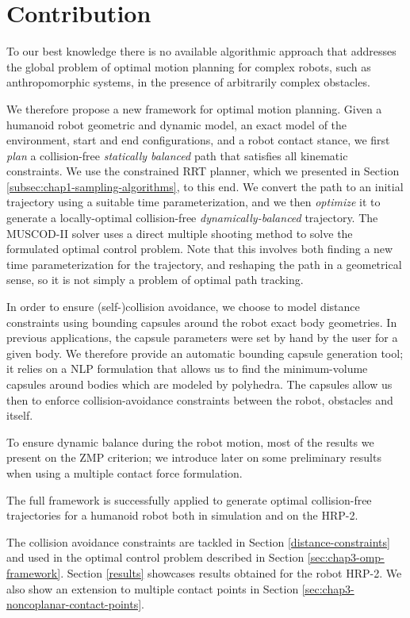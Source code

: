 \section{Contribution}
\label{sec:chap3-contribution}

To our best knowledge there is no available algorithmic approach that
addresses the global problem of optimal motion planning for complex
robots, such as anthropomorphic systems, in the presence of
arbitrarily complex obstacles.

We therefore propose a new framework for optimal motion
planning. Given a humanoid robot geometric and dynamic model, an exact
model of the environment, start and end configurations, and a robot
contact stance, we first \emph{plan} a collision-free \emph{statically
  balanced} path that satisfies all kinematic constraints. We use the
constrained RRT planner, which we presented in Section
\ref{subsec:chap1-sampling-algorithms}, to this end. We convert the
path to an initial trajectory using a suitable time parameterization,
and we then \emph{optimize} it to generate a locally-optimal
collision-free \emph{dynamically-balanced} trajectory. The
\textsc{MUSCOD-II} solver uses a direct multiple shooting method to
solve the formulated optimal control problem. Note that this involves
both finding a new time parameterization for the trajectory, and
reshaping the path in a geometrical sense, so it is not simply a
problem of optimal path tracking.

In order to ensure (self-)collision avoidance, we choose to model
distance constraints using bounding capsules around the robot exact
body geometries. In previous applications, the capsule parameters were
set by hand by the user for a given body. We therefore provide an
automatic bounding capsule generation tool; it relies on a NLP
formulation that allows us to find the minimum-volume capsules around
bodies which are modeled by polyhedra. The capsules allow us then to
enforce collision-avoidance constraints between the robot, obstacles
and itself.

To ensure dynamic balance during the robot motion, most of the results
we present on the ZMP criterion; we introduce later on some
preliminary results when using a multiple contact force formulation.

The full framework is successfully applied to generate optimal
collision-free trajectories for a humanoid robot both in simulation
and on the HRP-2.

The collision avoidance constraints are tackled in Section
\ref{distance-constraints} and used in the optimal control problem
described in Section \ref{sec:chap3-omp-framework}. Section
\ref{results} showcases results obtained for the robot HRP-2. We also
show an extension to multiple contact points in Section
\ref{sec:chap3-noncoplanar-contact-points}.


